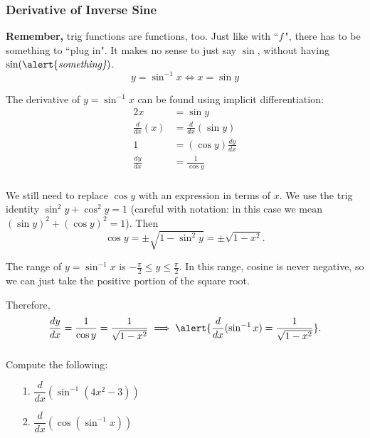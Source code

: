 \documentclass[14pt]{beamer}
\begin{document}
\begin{frame}
\frametitle{\small Derivative of Inverse Sine}
\footnotesize
{\bf Remember,} trig functions are functions, too.  Just like with ``$f\,$", there has to be something to ``plug in".  It makes no sense to just say $\sin$, without having $\sin(\text{\alert{\it something}})$.
\[y=\sin^{-1}x \Longleftrightarrow x=\sin y\]  

The derivative of $y=\sin^{-1}x$ can be found using implicit differentiation: 
\begin{alignat*}{2}
x &= \sin y \\
\frac{d}{dx}(x) &= \frac{d}{dx}(\sin y) \\
1 &= (\cos y) \frac{dy}{dx} \\
\frac{dy}{dx} &= \frac{1}{\cos y}
\end{alignat*}
\end{frame}

\begin{frame}
\frametitle{}
\footnotesize
We still need to replace $\cos y$ with an expression in terms of $x$.  We use the trig identity $\sin^2 y + \cos^2 y = 1$ (careful with notation: in this case we mean $\left(\sin y\right)^2+\left(\cos y\right)^2=1$).  Then 
\[\cos y= \pm \sqrt{1-\sin^2 y}=\pm\sqrt{1-x^2}.\]

The range of $y=\sin^{-1}x$ is $-\frac{\pi}{2} \leq y \leq \frac{\pi}{2}$.  In this range, cosine is never negative, so we can just take the positive portion of the square root.

\vspace{1pc}
Therefore,
\[\frac{dy}{dx}=\frac{1}{\cos y}=\frac{1}{\sqrt{1-x^2}} \implies \alert{\frac{d}{dx}(\sin^{-1}x)=\frac{1}{\sqrt{1-x^2}}}.\]
\end{frame}

\begin{frame}
\frametitle{}
\begin{exe} Compute the following:

\vspace{0.5pc}
\begin{itemize}
\item[1.] $\dfrac{d}{dx} \left( \sin^{-1}(4x^2-3) \right)$

\vspace{1pc}
\item[2.] $\dfrac{d}{dx} \left( \cos(\sin^{-1}x) \right)$
\end{itemize}
\end{exe}
\end{frame}
\end{document}
